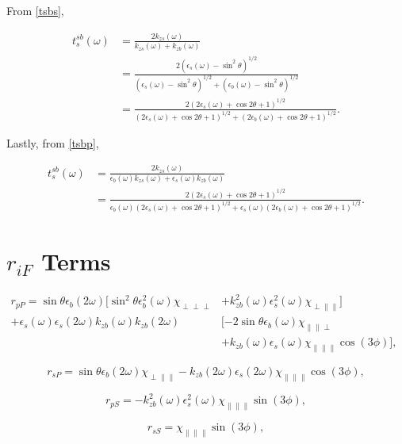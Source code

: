 \documentclass[10pt]{article}
\begin{document}
From \eqref{tsbs},

\begin{align*}
t^{sb}_{s}(\omega) &= \frac{2k_{zs}(\omega)}{k_{zs}(\omega) + k_{zb}(\omega)} \nonumber \\
&= \frac{2(\epsilon_{s}(\omega) - \sin^{2}\theta)^{1/2}}{(\epsilon_{s}(\omega) - \sin^{2}\theta)^{1/2} + (\epsilon_{b}(\omega) - \sin^{2}\theta)^{1/2}} \nonumber \\
&=\frac{2(2\epsilon_{s}(\omega) + \cos 2\theta + 1)^{1/2}}{(2\epsilon_{s}(\omega) + \cos 2\theta + 1)^{1/2} + (2\epsilon_{b}(\omega) + \cos 2\theta + 1)^{1/2}}.
\end{align*}

Lastly, from \eqref{tsbp},

\begin{align*}
t^{sb}_{s}(\omega) &= \frac{2k_{zs}(\omega)}{\epsilon_{b}(\omega)k_{zs}(\omega) + \epsilon_{s}(\omega)k_{zb}(\omega)} \nonumber \\
&=\frac{2(2\epsilon_{s}(\omega) + \cos 2\theta + 1)^{1/2}}{\epsilon_{b}(\omega)(2\epsilon_{s}(\omega) + \cos 2\theta + 1)^{1/2} + \epsilon_{s}(\omega)(2\epsilon_{b}(\omega) + \cos 2\theta + 1)^{1/2}}.
\end{align*}

\section{$r_{iF}$ Terms}

\begin{align*}
r_{pP} = \sin\theta\epsilon_{b}(2\omega)[\sin^{2}\theta\epsilon^{2}_{b}(\omega)\chi_{\perp\perp\perp} &+ k^{2}_{zb}(\omega)\epsilon^{2}_{s}(\omega)\chi_{\perp\parallel\parallel}] \nonumber \\
+ \epsilon_{s}(\omega)\epsilon_{s}(2\omega)k_{zb}(\omega)k_{zb}(2\omega)&[-2\sin\theta\epsilon_{b}(\omega)\chi_{\parallel\parallel\perp}&\\
&+ k_{zb}(\omega)\epsilon_{s}(\omega)\chi_{\parallel\parallel\parallel}\cos(3\phi)], \nonumber
\end{align*}

\begin{equation*}
r_{sP} = \sin\theta\epsilon_{b}(2\omega)\chi_{\perp\parallel\parallel} - k_{zb}(2\omega)\epsilon_{s}(2\omega)\chi_{\parallel\parallel\parallel}\cos(3\phi),
\end{equation*}

\begin{equation*}
r_{pS} = -k^{2}_{zb}(\omega)\epsilon^{2}_{s}(\omega)\chi_{\parallel\parallel\parallel}\sin(3\phi),
\end{equation*}

\begin{equation*}
r_{sS} = \chi_{\parallel\parallel\parallel}\sin(3\phi),
\end{equation*}



\end{document}
